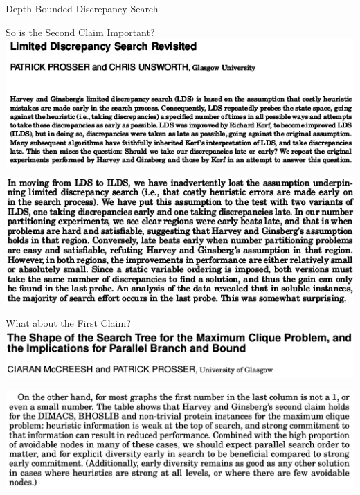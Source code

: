 \documentclass{beamer}
\begin{document}
\begin{frame}{Depth-Bounded Discrepancy Search}
\end{frame}

\begin{frame}{So is the Second Claim Important?}
    \centering\includegraphics*[keepaspectratio=true,scale=0.4]{ldsr-paper.png}

    \vspace{2em}

    \centering\includegraphics*[keepaspectratio=true,scale=0.4]{ldsr-conclusion.png}

    \vspace{0em}

\end{frame}

\begin{frame}{What about the First Claim?}
    \centering\includegraphics*[keepaspectratio=true,scale=0.2]{shape-paper.png}

    \vspace{2em}

    \centering\includegraphics*[keepaspectratio=true,scale=0.2]{shape-conclusion.png}

    \vspace{0em}

\end{frame}
\end{document}
